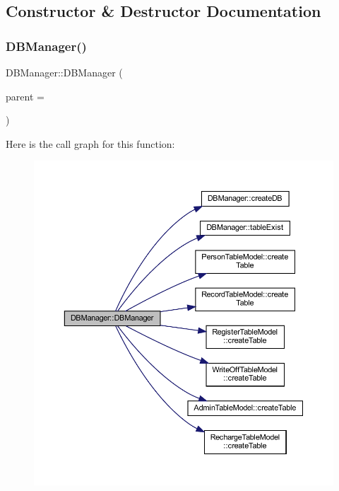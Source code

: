 \subsection{Constructor \& Destructor Documentation}
\mbox{\label{class_d_b_manager_a96ceb14668a63d2b99e0b01c708776bb}} 
\subsubsection{\texorpdfstring{DBManager()}{DBManager()}}
{\footnotesize\ttfamily D\+B\+Manager\+::\+D\+B\+Manager (\begin{DoxyParamCaption}\item[{Q\+Object $\ast$}]{parent = {} }\end{DoxyParamCaption})\hspace{0.3cm}{\ttfamily [explicit]}}

Here is the call graph for this function\+:
\nopagebreak
\begin{figure}[H]
\begin{center}
\leavevmode
\includegraphics[width=350pt]{class_d_b_manager_a96ceb14668a63d2b99e0b01c708776bb_cgraph}
\end{center}
\end{figure}


